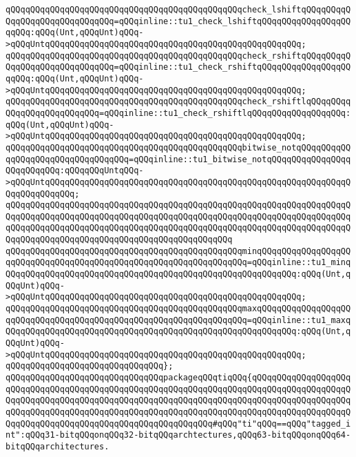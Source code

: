 \verb|qQQqqQQqqQQqqQQqqQQqqQQqqQQqqQQqqQQqqQQqqQQqqQQqcheck_lshiftqQQqqQQqqQQqqQQqqQQqqQQqqQQqqQQq=qQQqinline::tu1_check_lshiftqQQqqQQqqQQqqQQqqQQqqQQq:qQQq(Unt,qQQqUnt)qQQq->qQQqUntqQQqqQQqqQQqqQQqqQQqqQQqqQQqqQQqqQQqqQQqqQQqqQQqqQQq;|\newline
\verb|qQQqqQQqqQQqqQQqqQQqqQQqqQQqqQQqqQQqqQQqqQQqqQQqcheck_rshiftqQQqqQQqqQQqqQQqqQQqqQQqqQQqqQQq=qQQqinline::tu1_check_rshiftqQQqqQQqqQQqqQQqqQQqqQQq:qQQq(Unt,qQQqUnt)qQQq->qQQqUntqQQqqQQqqQQqqQQqqQQqqQQqqQQqqQQqqQQqqQQqqQQqqQQqqQQq;|\newline
\verb|qQQqqQQqqQQqqQQqqQQqqQQqqQQqqQQqqQQqqQQqqQQqqQQqcheck_rshiftlqQQqqQQqqQQqqQQqqQQqqQQqqQQq=qQQqinline::tu1_check_rshiftlqQQqqQQqqQQqqQQqqQQq:qQQq(Unt,qQQqUnt)qQQq->qQQqUntqQQqqQQqqQQqqQQqqQQqqQQqqQQqqQQqqQQqqQQqqQQqqQQqqQQq;|\newline
\verb|qQQqqQQqqQQqqQQqqQQqqQQqqQQqqQQqqQQqqQQqqQQqqQQqbitwise_notqQQqqQQqqQQqqQQqqQQqqQQqqQQqqQQqqQQq=qQQqinline::tu1_bitwise_notqQQqqQQqqQQqqQQqqQQqqQQqqQQq:qQQqqQQqUntqQQq->qQQqUntqQQqqQQqqQQqqQQqqQQqqQQqqQQqqQQqqQQqqQQqqQQqqQQqqQQqqQQqqQQqqQQqqQQqqQQqqQQq;|\newline
\verb|qQQqqQQqqQQqqQQqqQQqqQQqqQQqqQQqqQQqqQQqqQQqqQQqqQQqqQQqqQQqqQQqqQQqqQQqqQQqqQQqqQQqqQQqqQQqqQQqqQQqqQQqqQQqqQQqqQQqqQQqqQQqqQQqqQQqqQQqqQQqqQQqqQQqqQQqqQQqqQQqqQQqqQQqqQQqqQQqqQQqqQQqqQQqqQQqqQQqqQQqqQQqqQQqqQQqqQQqqQQqqQQqqQQqqQQqqQQqqQQqqQQqqQQqqQQqqQQq|\newline
\verb|qQQqqQQqqQQqqQQqqQQqqQQqqQQqqQQqqQQqqQQqqQQqqQQqminqQQqqQQqqQQqqQQqqQQqqQQqqQQqqQQqqQQqqQQqqQQqqQQqqQQqqQQqqQQqqQQqqQQq=qQQqinline::tu1_minqQQqqQQqqQQqqQQqqQQqqQQqqQQqqQQqqQQqqQQqqQQqqQQqqQQqqQQqqQQq:qQQq(Unt,qQQqUnt)qQQq->qQQqUntqQQqqQQqqQQqqQQqqQQqqQQqqQQqqQQqqQQqqQQqqQQqqQQqqQQq;|\newline
\verb|qQQqqQQqqQQqqQQqqQQqqQQqqQQqqQQqqQQqqQQqqQQqqQQqmaxqQQqqQQqqQQqqQQqqQQqqQQqqQQqqQQqqQQqqQQqqQQqqQQqqQQqqQQqqQQqqQQqqQQq=qQQqinline::tu1_maxqQQqqQQqqQQqqQQqqQQqqQQqqQQqqQQqqQQqqQQqqQQqqQQqqQQqqQQqqQQq:qQQq(Unt,qQQqUnt)qQQq->qQQqUntqQQqqQQqqQQqqQQqqQQqqQQqqQQqqQQqqQQqqQQqqQQqqQQqqQQq;|\newline
\verb|qQQqqQQqqQQqqQQqqQQqqQQqqQQqqQQq};|\newline
\newline
\verb|qQQqqQQqqQQqqQQqqQQqqQQqqQQqqQQqpackageqQQqtiqQQq{qQQqqQQqqQQqqQQqqQQqqQQqqQQqqQQqqQQqqQQqqQQqqQQqqQQqqQQqqQQqqQQqqQQqqQQqqQQqqQQqqQQqqQQqqQQqqQQqqQQqqQQqqQQqqQQqqQQqqQQqqQQqqQQqqQQqqQQqqQQqqQQqqQQqqQQqqQQqqQQqqQQqqQQqqQQqqQQqqQQqqQQqqQQqqQQqqQQqqQQqqQQqqQQqqQQqqQQqqQQqqQQqqQQqqQQqqQQqqQQqqQQqqQQqqQQqqQQqqQQqqQQqqQQqqQQq#qQQq"ti"qQQq==qQQq"tagged_int":qQQq31-bitqQQqonqQQq32-bitqQQqarchtectures,qQQq63-bitqQQqonqQQq64-bitqQQqarchitectures.|\newline
